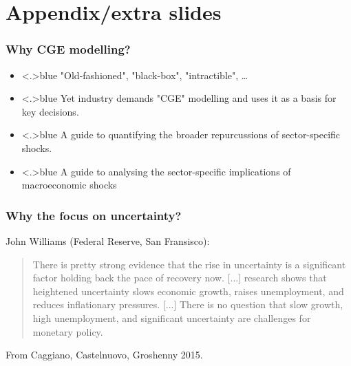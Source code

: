 \documentclass[handout,english]{beamer}
\begin{document}
\section{Appendix/extra slides}
\begin{frame}
  \frametitle{Why CGE modelling?}

  \begin{itemize}
    \item<+-|alert@+>{\color<.>{blue}
      "Old-fashioned", "black-box", "intractible", \dots
    }
    \item<+-|alert@+>{\color<.>{blue}
      Yet industry demands "CGE" modelling and uses it as a basis for key 
      decisions.
    }
    \item<+-|alert@+>{\color<.>{blue}
      A guide to quantifying the broader repurcussions of sector-specific
      shocks.
    }
    \item<+-|alert@+>{\color<.>{blue}
      A guide to analysing the sector-specific implications of macroeconomic shocks
    }
  \end{itemize}
\vfill
\end{frame}
\begin{frame}
\frametitle{Why the focus on uncertainty?}
John Williams (Federal Reserve, San Fransisco):

\begin{quote}
There is pretty strong evidence that the rise in uncertainty is a significant factor holding back the pace of recovery now. [...] research shows that heightened uncertainty slows economic growth, raises unemployment, and reduces inflationary pressures. [...] There is no question that slow growth, high unemployment, and significant uncertainty are challenges for monetary policy.
\end{quote}
From Caggiano, Castelnuovo, Groshenny 2015.
\end{frame}
\end{document}
